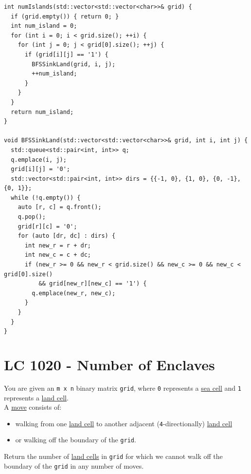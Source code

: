\begin{lstlisting}
int numIslands(std::vector<std::vector<char>>& grid) {
  if (grid.empty()) { return 0; }
  int num_island = 0;
  for (int i = 0; i < grid.size(); ++i) {
    for (int j = 0; j < grid[0].size(); ++j) {
      if (grid[i][j] == '1') {
        BFSSinkLand(grid, i, j);
        ++num_island;
      }
    }
  }
  return num_island;
}

void BFSSinkLand(std::vector<std::vector<char>>& grid, int i, int j) {
  std::queue<std::pair<int, int>> q;
  q.emplace(i, j);
  grid[i][j] = '0';
  std::vector<std::pair<int, int>> dirs = {{-1, 0}, {1, 0}, {0, -1}, {0, 1}};
  while (!q.empty()) {
    auto [r, c] = q.front();
    q.pop();
    grid[r][c] = '0';
    for (auto [dr, dc] : dirs) {
      int new_r = r + dr;
      int new_c = c + dc;
      if (new_r >= 0 && new_r < grid.size() && new_c >= 0 && new_c < grid[0].size()
          && grid[new_r][new_c] == '1') {
        q.emplace(new_r, new_c);
      }
    }
  }
}
\end{lstlisting}

\section{LC 1020 - Number of Enclaves}
You are given an {\colorbox{CodeBackground}{\lstinline|m x n|}} binary matrix {\colorbox{CodeBackground}{\lstinline|grid|}}, where {\colorbox{CodeBackground}{\lstinline|0|}} represents a \ul{sea cell} and {\colorbox{CodeBackground}{\lstinline|1|}} represents a \ul{land cell}.\\

A \ul{move} consists of:
\begin{itemize}
\item walking from one \ul{land cell} to another adjacent ({\colorbox{CodeBackground}{\lstinline|4|}}-directionally) \ul{land cell}
\item or walking off the boundary of the {\colorbox{CodeBackground}{\lstinline|grid|}}.
\end{itemize}

Return the number of \ul{land cells} in {\colorbox{CodeBackground}{\lstinline|grid|}} for which we cannot walk off the boundary of the {\colorbox{CodeBackground}{\lstinline|grid|}} in any number of moves.\\

